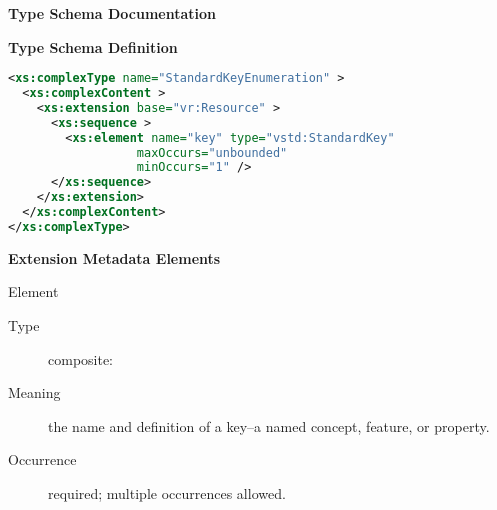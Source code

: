 \documentclass[11pt,a4paper]{ivoa}
\begin{document}
\begin{generated}
\begingroup
        \renewcommand*\descriptionlabel[1]{%
        \hbox to 5.5em{\emph{#1}\hfil}}\vspace{2ex}\noindent\textbf{ Type Schema Documentation}


\vspace{1ex}\noindent\textbf{ Type Schema Definition}

\begin{lstlisting}[language=XML,basicstyle=\footnotesize]
<xs:complexType name="StandardKeyEnumeration" >
  <xs:complexContent >
    <xs:extension base="vr:Resource" >
      <xs:sequence >
        <xs:element name="key" type="vstd:StandardKey"
                  maxOccurs="unbounded"
                  minOccurs="1" />
      </xs:sequence>
    </xs:extension>
  </xs:complexContent>
</xs:complexType>
\end{lstlisting}

\vspace{0.5ex}\noindent\textbf{ Extension Metadata Elements}

\begingroup\small\begin{bigdescription}\item[Element \xmlel{key}]
\begin{description}
\item[Type] composite: 
\item[Meaning]
                      the name and definition of a key--a named concept,
                      feature, or property.

\item[Occurrence] required; multiple occurrences allowed.

\end{description}


\end{bigdescription}\endgroup

\endgroup
\end{generated}
\end{document}

